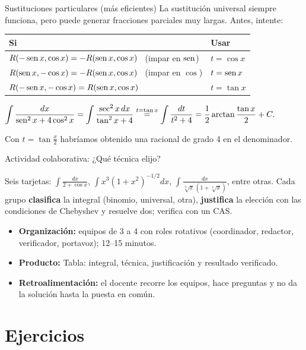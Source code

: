 \documentclass[10pt,aspectratio=169]{beamer}
\begin{document}
\begin{frame}{Sustituciones particulares (más eficientes)}
  La sustitución universal siempre funciona, pero puede generar fracciones parciales muy largas. Antes, intente:
  \renewcommand{\arraystretch}{1.5}
  \begin{center}
  \begin{tabular}{l|l}
    \textbf{Si} & \textbf{Usar}\\ \hline
    $R(-\operatorname{sen} x,\cos x)=-R(\operatorname{sen} x,\cos x)$ \ (impar en $\operatorname{sen}$) & $t=\cos x$\\
    $R(\operatorname{sen} x,-\cos x)=-R(\operatorname{sen} x,\cos x)$ \ (impar en $\cos$) & $t=\operatorname{sen} x$\\
    $R(-\operatorname{sen} x,-\cos x)=R(\operatorname{sen} x,\cos x)$ & $t=\tan x$
  \end{tabular}
  \end{center}
  \begin{ejemplo}[11: con $t=\tan x$]
    $\displaystyle\int\frac{dx}{\operatorname{sen}^2x+4\cos^2x}=\int\frac{\sec^2x\,dx}{\tan^2x+4}\overset{t=\tan x}{=}\int\frac{dt}{t^2+4}=\frac12\arctan\frac{\tan x}{2}+C.$
  \end{ejemplo}
  \small Con $t=\tan\frac x2$ habríamos obtenido una racional de grado 4 en el denominador.
\end{frame}

\begin{frame}{Actividad colaborativa: ¿Qué técnica elijo?}
  \small
  \begin{activa}
    Seis tarjetas: $\int\frac{dx}{2+\cos x}$, $\int x^3(1+x^2)^{-1/2}dx$, $\int\frac{dx}{\sqrt[3]{x}\,(1+\sqrt[3]{x})}$, entre otras. Cada grupo \textbf{clasifica} la integral (binomio, universal, otra), \textbf{justifica} la elección con las condiciones de Chebyshev y resuelve dos; verifica con un CAS.
  \end{activa}
  \begin{itemize}
    \item \textbf{Organización:} equipos de 3 a 4 con roles rotativos (coordinador, redactor, verificador, portavoz); 12--15 minutos.
    \item \textbf{Producto:} Tabla: integral, técnica, justificación y resultado verificado.
    \item \textbf{Retroalimentación:} el docente recorre los equipos, hace preguntas y no da la solución hasta la puesta en común.
  \end{itemize}
\end{frame}

\section{Ejercicios}
\end{document}
